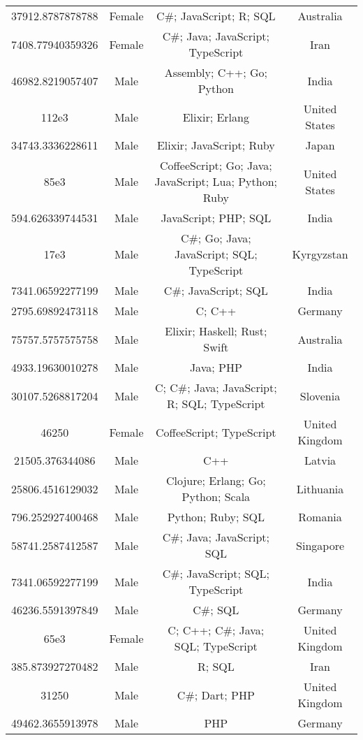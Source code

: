 \begin{center}
\begin{tabular}{ |c|c|c|c| }
37912.8787878788  &  Female  &  C\#; JavaScript; R; SQL  &  Australia  \\ 
7408.77940359326  &  Female  &  C\#; Java; JavaScript; TypeScript  &  Iran  \\ 
46982.8219057407  &  Male  &  Assembly; C++; Go; Python  &  India  \\ 
112e3  &  Male  &  Elixir; Erlang  &  United States  \\ 
34743.3336228611  &  Male  &  Elixir; JavaScript; Ruby  &  Japan  \\ 
85e3  &  Male  &  CoffeeScript; Go; Java; JavaScript; Lua; Python; Ruby  &  United States  \\ 
594.626339744531  &  Male  &  JavaScript; PHP; SQL  &  India  \\ 
17e3  &  Male  &  C\#; Go; Java; JavaScript; SQL; TypeScript  &  Kyrgyzstan  \\ 
7341.06592277199  &  Male  &  C\#; JavaScript; SQL  &  India  \\ 
2795.69892473118  &  Male  &  C; C++  &  Germany  \\ 
75757.5757575758  &  Male  &  Elixir; Haskell; Rust; Swift  &  Australia  \\ 
4933.19630010278  &  Male  &  Java; PHP  &  India  \\ 
30107.5268817204  &  Male  &  C; C\#; Java; JavaScript; R; SQL; TypeScript  &  Slovenia  \\ 
46250  &  Female  &  CoffeeScript; TypeScript  &  United Kingdom  \\ 
21505.376344086  &  Male  &  C++  &  Latvia  \\ 
25806.4516129032  &  Male  &  Clojure; Erlang; Go; Python; Scala  &  Lithuania  \\ 
796.252927400468  &  Male  &  Python; Ruby; SQL  &  Romania  \\ 
58741.2587412587  &  Male  &  C\#; Java; JavaScript; SQL  &  Singapore  \\ 
7341.06592277199  &  Male  &  C\#; JavaScript; SQL; TypeScript  &  India  \\ 
46236.5591397849  &  Male  &  C\#; SQL  &  Germany  \\ 
65e3  &  Female  &  C; C++; C\#; Java; SQL; TypeScript  &  United Kingdom  \\ 
385.873927270482  &  Male  &  R; SQL  &  Iran  \\ 
31250  &  Male  &  C\#; Dart; PHP  &  United Kingdom  \\ 
49462.3655913978  &  Male  &  PHP  &  Germany  \\ 

\end{tabular}
\end{center}
